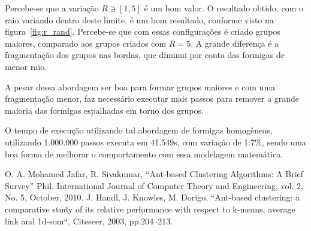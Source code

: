 \documentclass[conference]{IEEEtran}
\begin{document}
Percebe-se que a variação $R\ni[1,5]$ é um bom valor. O resultado obtido, com o raio variando dentro deste limite, é um bom resultado, conforme visto na figura~\ref{fig:r_rand}. Percebe-se que com essas configurações é criado grupos maiores, comparado aos grupos criados com $R=5$. A grande diferença é a fragmentação dos grupos nas bordas, que diminui por conta das formigas de menor raio.

A pesar dessa abordagem ser boa para formar grupos maiores e com uma fragmentação menor, faz necessário executar mais passos para remover a grande maioria das formigas espalhadas em torno dos grupos.

O tempo de execução utilizando tal abordagem de formigas homogêneas, utilizando 1.000.000 passos executa em 41.549s, com variação de 1.7\%, sendo uma boa forma de melhorar o comportamento com essa modelagem matemática.

\begin{thebibliography}{00}
 O. A. Mohamed Jafar, R. Sivakumar, ``Ant-based Clustering Algorithms: A Brief 
Survey'' Phil. International Journal of Computer Theory and Engineering, vol. 2, No. 5, October, 2010.
 J. Handl, J. Knowles, M. Dorigo, ``Ant-based clustering: a comparative study of its relative performance with respect to k-means, average link and 1d-som``, Citeseer, 2003, pp.204--213.
\end{thebibliography}
\end{document}
